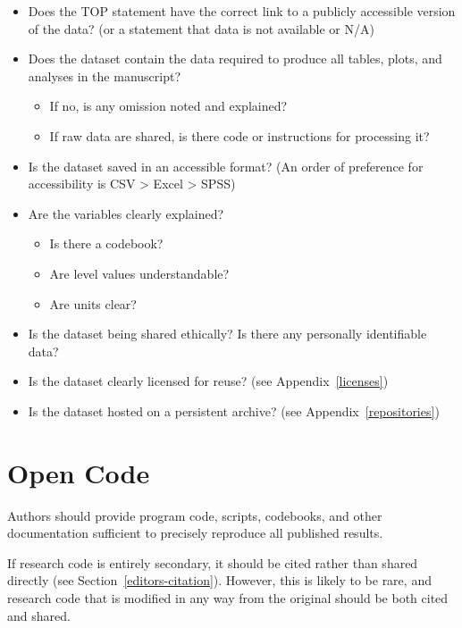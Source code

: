 \documentclass[
  oneside]{book}
\providecommand{\tightlist}{%
  \setlength{\itemsep}{0pt}\setlength{\parskip}{0pt}}
\begin{document}
\begin{itemize}
\tightlist
\item
  Does the TOP statement have the correct link to a publicly accessible version of the data? (or a statement that data is not available or N/A)
\item
  Does the dataset contain the data required to produce all tables, plots, and analyses in the manuscript?

  \begin{itemize}
  \tightlist
  \item
    If no, is any omission noted and explained?
  \item
    If raw data are shared, is there code or instructions for processing it?
  \end{itemize}
\item
  Is the dataset saved in an accessible format? (An order of preference for accessibility is CSV \textgreater{} Excel \textgreater{} SPSS)
\item
  Are the variables clearly explained?

  \begin{itemize}
  \tightlist
  \item
    Is there a codebook?
  \item
    Are level values understandable?
  \item
    Are units clear?
  \end{itemize}
\item
  Is the dataset being shared ethically? Is there any personally identifiable data?
\item
  Is the dataset clearly licensed for reuse? (see Appendix~\ref{licenses})
\item
  Is the dataset hosted on a persistent archive? (see Appendix~\ref{repositories})
\end{itemize}

\hypertarget{editors-open-code}{%
\chapter{Open Code}\label{editors-open-code}}

Authors should provide program code, scripts, codebooks, and other documentation sufficient to precisely reproduce all published results.

If research code is entirely secondary, it should be cited rather than shared directly (see Section~\ref{editors-citation}). However, this is likely to be rare, and research code that is modified in any way from the original should be both cited and shared.
\end{document}
